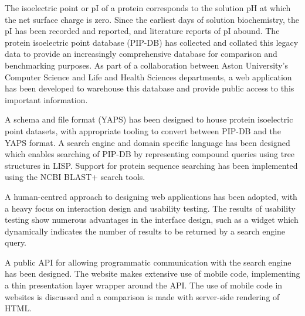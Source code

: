 \thispagestyle{plain}


\begin{center}
  \Large
  \textbf{\@title}

  \vspace{0.4cm}
  \large
  \subtitle{}

  \vspace{0.4cm}
  \@author
\end{center}



The isoelectric point or pI of a protein corresponds to the solution
pH at which the net surface charge is zero. Since the earliest days of
solution biochemistry, the pI has been recorded and reported, and
literature reports of pI abound. The protein isoelectric point
database (PIP-DB) has collected and collated this legacy data to
provide an increasingly comprehensive database for comparison and
benchmarking purposes. As part of a collaboration between Aston
University's Computer Science and Life and Health Sciences
departments, a web application has been developed to warehouse this
database and provide public access to this important information.

A schema and file format (YAPS) has been designed to house protein
isoelectric point datasets, with appropriate tooling to convert
between PIP-DB and the YAPS format. A search engine and domain
specific language has been designed which enables searching of PIP-DB
by representing compound queries using tree structures in
LISP. Support for protein sequence searching has been implemented
using the NCBI BLAST+ search tools.

A human-centred approach to designing web applications has been
adopted, with a heavy focus on interaction design and usability
testing. The results of usability testing show numerous advantages in
the interface design, such as a widget which dynamically indicates the
number of results to be returned by a search engine query.

A public API for allowing programmatic communication with the search
engine has been designed. The website makes extensive use of mobile
code, implementing a thin presentation layer wrapper around the
API. The use of mobile code in websites is discussed and a comparison
is made with server-side rendering of HTML.

